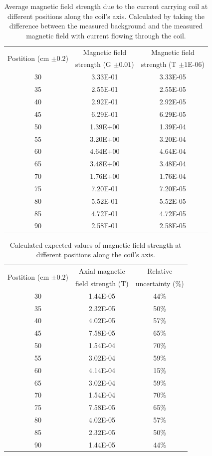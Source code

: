 \begin{table}[H]
\vspace{4mm}
\begin{tabular}{|c|c|c|}
\hline
\multirow{2}{*}{Postition (cm $\pm0.2$)} & Magnetic field     & Magnetic field     \\ 
       &            strength (G $\pm0.01$)   & strength (T $\pm 1$E-06)\\ \hline 
30     & 3.33E-01 & 3.33E-05 \\
35     & 2.55E-01 & 2.55E-05 \\
40     & 2.92E-01 & 2.92E-05 \\
45     & 6.29E-01 & 6.29E-05 \\
50     & 1.39E+00 & 1.39E-04 \\
55     & 3.20E+00 & 3.20E-04 \\
60     & 4.64E+00 & 4.64E-04 \\
65     & 3.48E+00 & 3.48E-04 \\
70     & 1.76E+00 & 1.76E-04 \\
75     & 7.20E-01 & 7.20E-05 \\
80     & 5.52E-01 & 5.52E-05 \\
85     & 4.72E-01 & 4.72E-05 \\
90     & 2.58E-01 & 2.58E-05 \\ \hline
\end{tabular}
\caption{Average magnetic field strength due to the current carrying coil at different positions along the coil's axis. Calculated by taking the difference between the measured background and the measured magnetic field with current flowing through the coil.}
\label{table: Averages}
\end{table}

\begin{table}[H]
\begin{tabular}{|c|c|c|}
\hline
\multirow{2}{*}{Postition (cm $\pm0.2$)} & Axial magnetic  & Relative \\
& field strength (T) & uncertainty (\%) \\ \hline
30 & 1.44E-05 & 44\% \\
35 & 2.32E-05 & 50\% \\
40 & 4.02E-05 & 57\% \\
45 & 7.58E-05 & 65\% \\
50 & 1.54E-04 & 70\% \\
55 & 3.02E-04 & 59\% \\
60 & 4.14E-04 & 15\% \\
65 & 3.02E-04 & 59\% \\
70 & 1.54E-04 & 70\% \\
75 & 7.58E-05 & 65\% \\
80 & 4.02E-05 & 57\% \\
85 & 2.32E-05 & 50\% \\
90 & 1.44E-05 & 44\% \\ \hline
\end{tabular}
\caption{Calculated expected values of magnetic field strength at different positions along the coil's axis.}
\label{table: Theoretical}
\end{table}

